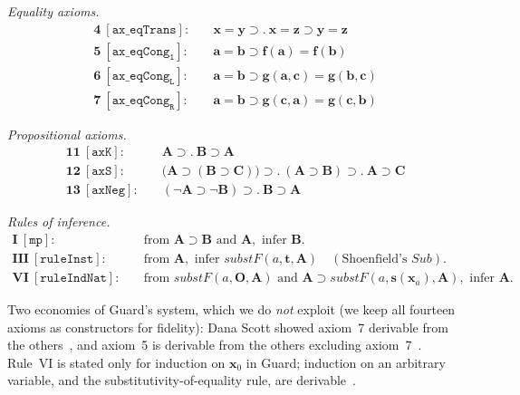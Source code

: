 \documentclass[11pt]{article}
\theoremstyle{plain}
\theoremstyle{definition}
\theoremstyle{remark}
\newcommand{\Sub}{\mathit{Sub}}
\newcommand{\substF}{\mathit{substF}}
\begin{document}
\noindent\emph{Equality axioms.}
\begin{align*}
\textbf{4}\ [\mathtt{ax\_eqTrans}]:\quad & \mathbf{x} = \mathbf{y} \supset .\ \mathbf{x} = \mathbf{z} \supset \mathbf{y} = \mathbf{z} \\
\textbf{5}\ [\mathtt{ax\_eqCong_1}]:\quad & \mathbf{a} = \mathbf{b} \supset \mathbf{f}(\mathbf{a}) = \mathbf{f}(\mathbf{b}) \\
\textbf{6}\ [\mathtt{ax\_eqCong_L}]:\quad & \mathbf{a} = \mathbf{b} \supset \mathbf{g}(\mathbf{a},\mathbf{c}) = \mathbf{g}(\mathbf{b},\mathbf{c}) \\
\textbf{7}\ [\mathtt{ax\_eqCong_R}]:\quad & \mathbf{a} = \mathbf{b} \supset \mathbf{g}(\mathbf{c},\mathbf{a}) = \mathbf{g}(\mathbf{c},\mathbf{b})
\end{align*}

\noindent\emph{Propositional axioms.}
\begin{align*}
\textbf{11}\ [\mathtt{axK}]:\quad & \mathbf{A} \supset .\ \mathbf{B} \supset \mathbf{A} \\
\textbf{12}\ [\mathtt{axS}]:\quad & \bigl(\mathbf{A} \supset (\mathbf{B} \supset \mathbf{C})\bigr) \supset .\ (\mathbf{A} \supset \mathbf{B}) \supset .\ \mathbf{A} \supset \mathbf{C} \\
\textbf{13}\ [\mathtt{axNeg}]:\quad & (\neg\mathbf{A} \supset \neg\mathbf{B}) \supset .\ \mathbf{B} \supset \mathbf{A}
\end{align*}

\noindent\emph{Rules of inference.}
\begin{align*}
\textbf{I}\ [\mathtt{mp}]:\quad & \text{from } \mathbf{A} \supset \mathbf{B} \text{ and } \mathbf{A}, \text{ infer } \mathbf{B}. \\
\textbf{III}\ [\mathtt{ruleInst}]:\quad & \text{from } \mathbf{A}, \text{ infer } \substF(a, \mathbf{t}, \mathbf{A}) \quad (\text{Shoenfield's } \Sub). \\
\textbf{VI}\ [\mathtt{ruleIndNat}]:\quad & \text{from } \substF(a, \mathbf{O}, \mathbf{A}) \text{ and } \mathbf{A} \supset \substF(a, \mathbf{s}(\mathbf{x}_a), \mathbf{A}), \text{ infer } \mathbf{A}.
\end{align*}

Two economies of Guard's system, which we do \emph{not} exploit (we keep
all fourteen axioms as constructors for fidelity): Dana Scott showed
axiom~7 derivable from the others~\cite[Exercise after Def.~6]{Guard63},
and axiom~5 is derivable from the others excluding
axiom~7~\cite[Exercise~18]{Guard63}.  Rule~VI is stated only for
induction on $\mathbf{x}_0$ in Guard; induction on an arbitrary variable,
and the substitutivity-of-equality rule, are derivable~\cite[Exercise~19]{Guard63}.
\end{document}
